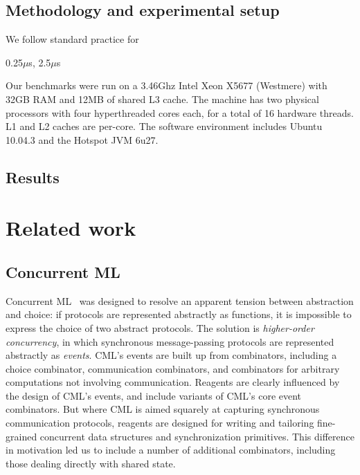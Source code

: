 \documentclass[preprint]{sigplanconf}
\begin{document}
\subsection{Methodology and experimental setup}

We follow standard practice for 

0.25$\mu$s, 2.5$\mu$s

Our benchmarks were run on a 3.46Ghz Intel Xeon X5677 (Westmere) with 32GB RAM
and 12MB of shared L3 cache.  The machine has two physical processors with
four hyperthreaded cores each, for a total of 16 hardware threads.  L1 and L2
caches are per-core.  The software environment includes Ubuntu 10.04.3 and
the Hotspot JVM 6u27.

\subsection{Results}


\section{Related work}
\label{sec:related}


\subsection{Concurrent ML}

Concurrent ML~\cite{Reppy1991} was designed to resolve an apparent tension
between abstraction and choice: if protocols are represented abstractly as
functions, it is impossible to express the choice of two abstract protocols.
The solution is \emph{higher-order concurrency}, in which synchronous
message-passing protocols are represented abstractly as \emph{events}.  CML's
events are built up from combinators, including a choice combinator,
communication combinators, and combinators for arbitrary computations not
involving communication.  
Reagents are clearly influenced by the design of CML's events, and include
variants of CML's core event combinators.
But where CML is aimed squarely at capturing synchronous communication
protocols, reagents are designed for writing and tailoring fine-grained
concurrent data structures and synchronization primitives.  This difference in
motivation led us to include a number of additional combinators, including
those dealing directly with shared state.
\end{document}
